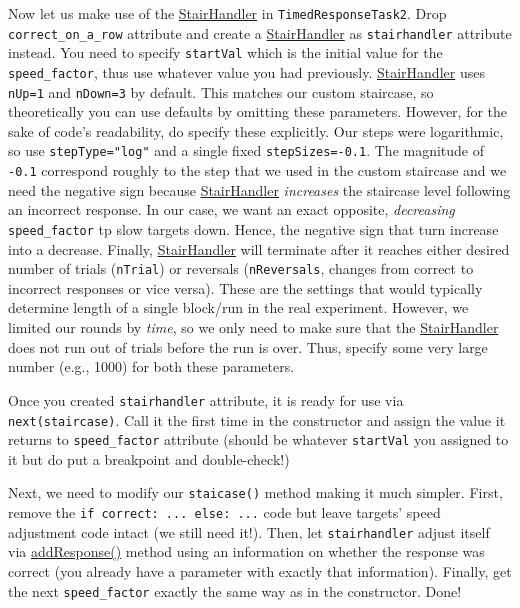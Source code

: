 \documentclass[
]{book}
\begin{document}
Now let us make use of the \href{https://psychopy.org/api/data.html\#stairhandler}{StairHandler} in \texttt{TimedResponseTask2}. Drop \texttt{correct\_on\_a\_row} attribute and create a \href{https://psychopy.org/api/data.html\#stairhandler}{StairHandler} as \texttt{stairhandler} attribute instead. You need to specify \texttt{startVal} which is the initial value for the \texttt{speed\_factor}, thus use whatever value you had previously. \href{https://psychopy.org/api/data.html\#stairhandler}{StairHandler} uses \texttt{nUp=1} and \texttt{nDown=3} by default. This matches our custom staircase, so theoretically you can use defaults by omitting these parameters. However, for the sake of code's readability, do specify these explicitly. Our steps were logarithmic, so use \texttt{stepType="log"} and a single fixed \texttt{stepSizes=-0.1}. The magnitude of \texttt{-0.1} correspond roughly to the step that we used in the custom staircase and we need the negative sign because \href{https://psychopy.org/api/data.html\#stairhandler}{StairHandler} \emph{increases} the staircase level following an incorrect response. In our case, we want an exact opposite, \emph{decreasing} \texttt{speed\_factor} tp slow targets down. Hence, the negative sign that turn increase into a decrease. Finally, \href{https://psychopy.org/api/data.html\#stairhandler}{StairHandler} will terminate after it reaches either desired number of trials (\texttt{nTrial}) or reversals (\texttt{nReversals}, changes from correct to incorrect responses or vice versa). These are the settings that would typically determine length of a single block/run in the real experiment. However, we limited our rounds by \emph{time}, so we only need to make sure that the \href{https://psychopy.org/api/data.html\#stairhandler}{StairHandler} does not run out of trials before the run is over. Thus, specify some very large number (e.g., 1000) for both these parameters.

Once you created \texttt{stairhandler} attribute, it is ready for use via \texttt{next(staircase)}. Call it the first time in the constructor and assign the value it returns to \texttt{speed\_factor} attribute (should be whatever \texttt{startVal} you assigned to it but do put a breakpoint and double-check!)

Next, we need to modify our \texttt{staicase()} method making it much simpler. First, remove the \texttt{if\ correct:\ ...\ else:\ ...} code but leave targets' speed adjustment code intact (we still need it!). Then, let \texttt{stairhandler} adjust itself via \href{https://psychopy.org/api/data.html\#psychopy.data.StairHandler.addResponse}{addResponse()} method using an information on whether the response was correct (you already have a parameter with exactly that information). Finally, get the next \texttt{speed\_factor} exactly the same way as in the constructor. Done!
\end{document}
